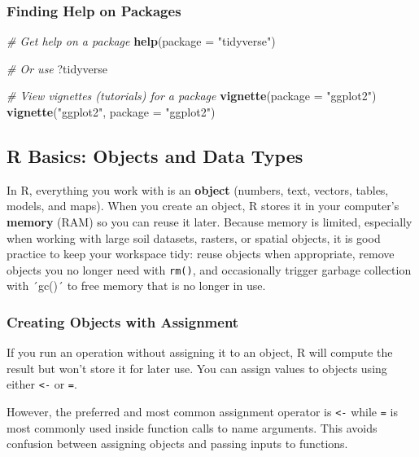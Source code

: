 \documentclass[
  10pt,
  b5paper,
  oneside]{book}
\newenvironment{Shaded}{\begin{snugshade}}{\end{snugshade}}
\newcommand{\AttributeTok}[1]{\textcolor[rgb]{0.13,0.29,0.53}{#1}}
\newcommand{\CommentTok}[1]{\textcolor[rgb]{0.56,0.35,0.01}{\textit{#1}}}
\newcommand{\FunctionTok}[1]{\textcolor[rgb]{0.13,0.29,0.53}{\textbf{#1}}}
\newcommand{\NormalTok}[1]{#1}
\newcommand{\StringTok}[1]{\textcolor[rgb]{0.31,0.60,0.02}{#1}}
\begin{document}
\subsubsection{Finding Help on Packages}\label{finding-help-on-packages}

\begin{Shaded}
\begin{Highlighting}[]
\CommentTok{\# Get help on a package}
\FunctionTok{help}\NormalTok{(}\AttributeTok{package =} \StringTok{"tidyverse"}\NormalTok{)}

\CommentTok{\# Or use}
\NormalTok{?tidyverse}

\CommentTok{\# View vignettes (tutorials) for a package}
\FunctionTok{vignette}\NormalTok{(}\AttributeTok{package =} \StringTok{"ggplot2"}\NormalTok{)}
\FunctionTok{vignette}\NormalTok{(}\StringTok{"ggplot2"}\NormalTok{, }\AttributeTok{package =} \StringTok{"ggplot2"}\NormalTok{)}
\end{Highlighting}
\end{Shaded}

\subsection{R Basics: Objects and Data Types}\label{object-types}

In R, everything you work with is an \textbf{object} (numbers, text, vectors, tables, models, and maps). When you create an object, R stores it in your computer's \textbf{memory} (RAM) so you can reuse it later. Because memory is limited, especially when working with large soil datasets, rasters, or spatial objects, it is good practice to keep your workspace tidy: reuse objects when appropriate, remove objects you no longer need with \texttt{rm()}, and occasionally trigger garbage collection with ´gc()´ to free memory that is no longer in use.

\subsubsection{Creating Objects with Assignment}\label{object-assignment}

If you run an operation without assigning it to an object, R will compute the result but won't store it for later use.
You can assign values to objects using either \texttt{\textless{}-} or \texttt{=}.

However, the preferred and most common assignment operator is \texttt{\textless{}-} while \texttt{=} is most commonly used inside function calls to name arguments. This avoids confusion between assigning objects and passing inputs to functions.
\end{document}
